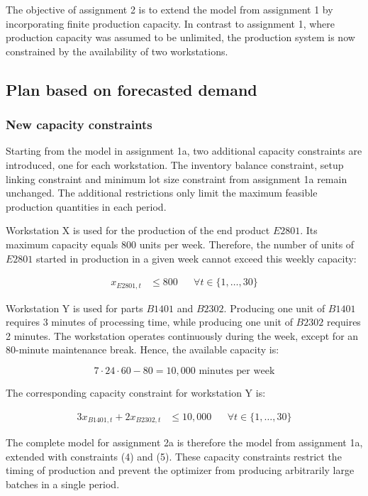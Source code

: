 \documentclass[a4paper,faculty=eb,language=en,doctype=article,sftitles=false]{ugent-doc}
\begin{document}
The objective of assignment 2 is to extend the model from assignment 1 by incorporating finite production capacity. In contrast to assignment 1, where production capacity was assumed to be unlimited, the production system is now constrained by the availability of two workstations.

\subsection{Plan based on forecasted demand}

\subsubsection{New capacity constraints}

Starting from the model in assignment 1a, two additional capacity constraints are introduced, one for each workstation. The inventory balance constraint, setup linking constraint and minimum lot size constraint from assignment 1a remain unchanged. The additional restrictions only limit the maximum feasible production quantities in each period.

Workstation X is used for the production of the end product \(E2801\). Its maximum capacity equals 800 units per week. Therefore, the number of units of \(E2801\) started in production in a given week cannot exceed this weekly capacity:

\begin{align}
x_{E2801,t} &\leq 800
&& \forall t \in \{1,\ldots,30\}
\tag{4}
\end{align}

Workstation Y is used for parts \(B1401\) and \(B2302\). Producing one unit of \(B1401\) requires 3 minutes of processing time, while producing one unit of \(B2302\) requires 2 minutes. The workstation operates continuously during the week, except for an 80-minute maintenance break. Hence, the available capacity is:

\[
7 \cdot 24 \cdot 60 - 80 = 10{,}000 \text{ minutes per week}
\]

The corresponding capacity constraint for workstation Y is:

\begin{align}
3x_{B1401,t} + 2x_{B2302,t} &\leq 10{,}000
&& \forall t \in \{1,\ldots,30\}
\tag{5}
\end{align}

The complete model for assignment 2a is therefore the model from assignment 1a, extended with constraints (4) and (5). These capacity constraints restrict the timing of production and prevent the optimizer from producing arbitrarily large batches in a single period.
\end{document}
